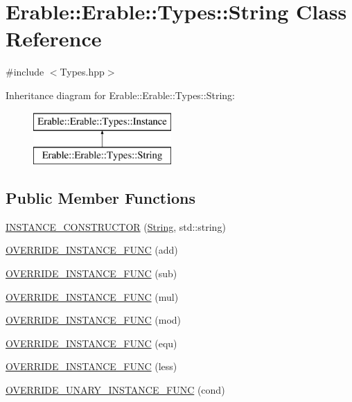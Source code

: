 \hypertarget{class_erable_1_1_erable_1_1_types_1_1_string}{}\section{Erable\+::Erable\+::Types\+::String Class Reference}
\label{class_erable_1_1_erable_1_1_types_1_1_string}


{\ttfamily \#include $<$Types.\+hpp$>$}

Inheritance diagram for Erable\+::Erable\+::Types\+::String\+:\begin{figure}[H]
\begin{center}
\leavevmode
\includegraphics[height=2.000000cm]{class_erable_1_1_erable_1_1_types_1_1_string}
\end{center}
\end{figure}
\subsection*{Public Member Functions}
\begin{DoxyCompactItemize}
\item 
\mbox{\hyperlink{class_erable_1_1_erable_1_1_types_1_1_string_a6043c691c87eed3985cb5249715c03ae}{I\+N\+S\+T\+A\+N\+C\+E\+\_\+\+C\+O\+N\+S\+T\+R\+U\+C\+T\+OR}} (\mbox{\hyperlink{class_erable_1_1_erable_1_1_types_1_1_string}{String}}, std\+::string)
\item 
\mbox{\hyperlink{class_erable_1_1_erable_1_1_types_1_1_string_a4fcaccd39704712c5c12b0ac8f3034a8}{O\+V\+E\+R\+R\+I\+D\+E\+\_\+\+I\+N\+S\+T\+A\+N\+C\+E\+\_\+\+F\+U\+NC}} (add)
\item 
\mbox{\hyperlink{class_erable_1_1_erable_1_1_types_1_1_string_ab6ae8897aa66b51c148a44739687cd20}{O\+V\+E\+R\+R\+I\+D\+E\+\_\+\+I\+N\+S\+T\+A\+N\+C\+E\+\_\+\+F\+U\+NC}} (sub)
\item 
\mbox{\hyperlink{class_erable_1_1_erable_1_1_types_1_1_string_a93b69da1f707a213c365cf36420c7a72}{O\+V\+E\+R\+R\+I\+D\+E\+\_\+\+I\+N\+S\+T\+A\+N\+C\+E\+\_\+\+F\+U\+NC}} (mul)
\item 
\mbox{\hyperlink{class_erable_1_1_erable_1_1_types_1_1_string_a221e87ec808713c475dc7e29fe6d0157}{O\+V\+E\+R\+R\+I\+D\+E\+\_\+\+I\+N\+S\+T\+A\+N\+C\+E\+\_\+\+F\+U\+NC}} (mod)
\item 
\mbox{\hyperlink{class_erable_1_1_erable_1_1_types_1_1_string_ad3d73ef5d2c0e88006121b2822c8e306}{O\+V\+E\+R\+R\+I\+D\+E\+\_\+\+I\+N\+S\+T\+A\+N\+C\+E\+\_\+\+F\+U\+NC}} (equ)
\item 
\mbox{\hyperlink{class_erable_1_1_erable_1_1_types_1_1_string_a4227c2f3661d4f7cf3f9e1f8d6a404b2}{O\+V\+E\+R\+R\+I\+D\+E\+\_\+\+I\+N\+S\+T\+A\+N\+C\+E\+\_\+\+F\+U\+NC}} (less)
\item 
\mbox{\hyperlink{class_erable_1_1_erable_1_1_types_1_1_string_a28ae1661382e8e359ac52c6e297bc70d}{O\+V\+E\+R\+R\+I\+D\+E\+\_\+\+U\+N\+A\+R\+Y\+\_\+\+I\+N\+S\+T\+A\+N\+C\+E\+\_\+\+F\+U\+NC}} (cond)
\end{DoxyCompactItemize}
